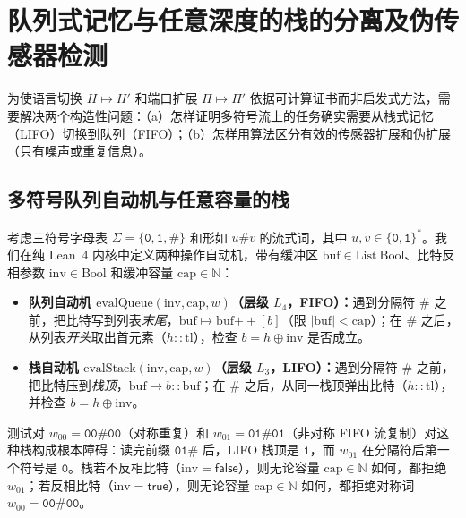 \documentclass[11pt,a4paper]{article}
\theoremstyle{cleanthm}
\theoremstyle{cleandef}
\begin{document}
\section{队列式记忆与任意深度的栈的分离及伪传感器检测}

为使语言切换 $H\mapsto H'$ 和端口扩展 $\Pi\mapsto\Pi'$ 依据可计算证书而非启发式方法，需要解决两个构造性问题：（a）怎样证明多符号流上的任务确实需要从栈式记忆（LIFO）切换到队列（FIFO）；（b）怎样用算法区分有效的传感器扩展和伪扩展（只有噪声或重复信息）。

\subsection{多符号队列自动机与任意容量的栈}

考虑三符号字母表 $\Sigma=\{\mathtt{0},\mathtt{1},\mathtt{\#}\}$ 和形如 $u\mathtt{\#}v$ 的流式词，其中 $u,v\in\{\mathtt{0},\mathtt{1}\}^*$。我们在纯 Lean~4 内核中定义两种操作自动机，带有缓冲区 $\mathrm{buf}\in\mathrm{List\ Bool}$、比特反相参数 $\mathrm{inv}\in\mathrm{Bool}$ 和缓冲容量 $\mathrm{cap}\in\mathbb{N}$：
\begin{itemize}
  \item \textbf{队列自动机 $\mathrm{evalQueue}(\mathrm{inv},\mathrm{cap},w)$（层级 $L_4$，FIFO）：}遇到分隔符 $\mathtt{\#}$ 之前，把比特写到列表\emph{末尾}，$\mathrm{buf}\mapsto\mathrm{buf}\mathbin{+\!+}[b]$（限 $|\mathrm{buf}|<\mathrm{cap}$）；在 $\mathtt{\#}$ 之后，从列表\emph{开头}取出首元素（$h::\mathrm{tl}$），检查 $b = h \oplus \mathrm{inv}$ 是否成立。
  \item \textbf{栈自动机 $\mathrm{evalStack}(\mathrm{inv},\mathrm{cap},w)$（层级 $L_3$，LIFO）：}遇到分隔符 $\mathtt{\#}$ 之前，把比特压到\emph{栈顶}，$\mathrm{buf}\mapsto b::\mathrm{buf}$；在 $\mathtt{\#}$ 之后，从同一栈顶弹出比特（$h::\mathrm{tl}$），并检查 $b = h \oplus \mathrm{inv}$。
\end{itemize}

测试对 $w_{00}=\mathtt{00\#00}$（对称重复）和 $w_{01}=\mathtt{01\#01}$（非对称 FIFO 流复制）对这种栈构成根本障碍：读完前缀 $\mathtt{01\#}$ 后，LIFO 栈顶是 $\mathtt{1}$，而 $w_{01}$ 在分隔符后第一个符号是 $\mathtt{0}$。栈若不反相比特（$\mathrm{inv}=\mathsf{false}$），则无论容量 $\mathrm{cap}\in\mathbb{N}$ 如何，都拒绝 $w_{01}$；若反相比特（$\mathrm{inv}=\mathsf{true}$），则无论容量 $\mathrm{cap}\in\mathbb{N}$ 如何，都拒绝对称词 $w_{00}=\mathtt{00\#00}$。
\end{document}
